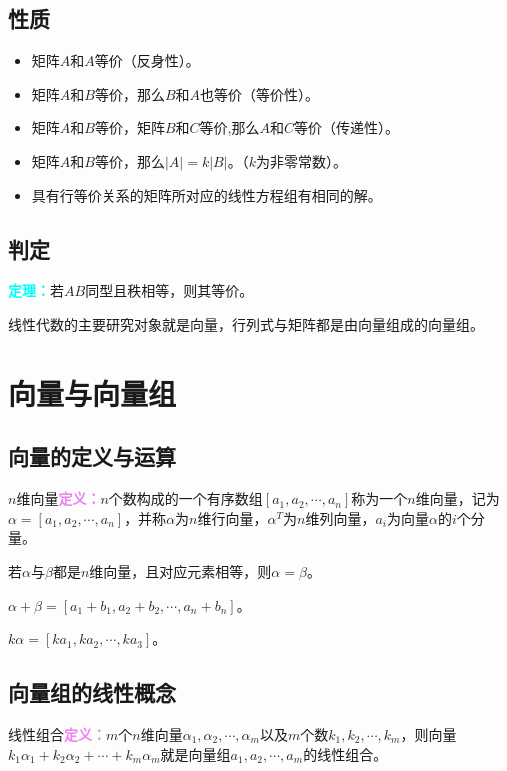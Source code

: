 \documentclass[UTF8, 12pt]{ctexart}
\begin{document}
\subsection{性质}

\begin{itemize}
\item 矩阵$A$和$A$等价（反身性）。
\item 矩阵$A$和$B$等价，那么$B$和$A$也等价（等价性）。
\item 矩阵$A$和$B$等价，矩阵$B$和$C$等价,那么$A$和$C$等价（传递性）。
\item 矩阵$A$和$B$等价，那么$\vert A\vert=k\vert B\vert$。（$k$为非零常数）。
\item 具有行等价关系的矩阵所对应的线性方程组有相同的解。
\end{itemize}

\subsection{判定}

\textcolor{aqua}{\textbf{定理：}}若$AB$同型且秩相等，则其等价。

线性代数的主要研究对象就是向量，行列式与矩阵都是由向量组成的向量组。

\section{向量与向量组}

\subsection{向量的定义与运算}

$n$维向量\textcolor{violet}{\textbf{定义：}}$n$个数构成的一个有序数组$[a_1,a_2,\cdots,a_n]$称为一个$n$维向量，记为$\alpha=[a_1,a_2,\cdots,a_n]$，并称$\alpha$为$n$维行向量，$\alpha^T$为$n$维列向量，$a_i$为向量$\alpha$的$i$个分量。

若$\alpha$与$\beta$都是$n$维向量，且对应元素相等，则$\alpha=\beta$。

$\alpha+\beta=[a_1+b_1,a_2+b_2,\cdots,a_n+b_n]$。

$k\alpha=[ka_1,ka_2,\cdots,ka_3]$。

\subsection{向量组的线性概念}

线性组合\textcolor{violet}{\textbf{定义：}}$m$个$n$维向量$\alpha_1,\alpha_2,\cdots,\alpha_m$以及$m$个数$k_1,k_2,\cdots,k_m$，则向量$k_1\alpha_1+k_2\alpha_2+\cdots+k_m\alpha_m$就是向量组$a_1,a_2,\cdots,a_m$的线性组合。
\end{document}
